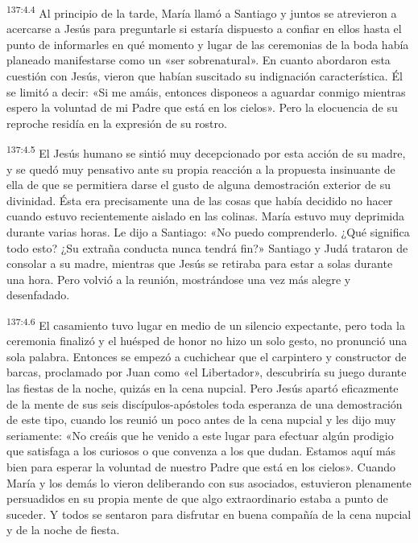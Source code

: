 \par 
\textsuperscript{137:4.4} Al principio de la tarde, María llamó a Santiago y juntos se atrevieron a acercarse a Jesús para preguntarle si estaría dispuesto a confiar en ellos hasta el punto de informarles en qué momento y lugar de las ceremonias de la boda había planeado manifestarse como un «ser sobrenatural». En cuanto abordaron esta cuestión con Jesús, vieron que habían suscitado su indignación característica. Él se limitó a decir: «Si me amáis, entonces disponeos a aguardar conmigo mientras espero la voluntad de mi Padre que está en los cielos». Pero la elocuencia de su reproche residía en la expresión de su rostro.

\par 
\textsuperscript{137:4.5} El Jesús humano se sintió muy decepcionado por esta acción de su madre, y se quedó muy pensativo ante su propia reacción a la propuesta insinuante de ella de que se permitiera darse el gusto de alguna demostración exterior de su divinidad. Ésta era precisamente una de las cosas que había decidido no hacer cuando estuvo recientemente aislado en las colinas. María estuvo muy deprimida durante varias horas. Le dijo a Santiago: «No puedo comprenderlo. ¿Qué significa todo esto? ¿Su extraña conducta nunca tendrá fin?» Santiago y Judá trataron de consolar a su madre, mientras que Jesús se retiraba para estar a solas durante una hora. Pero volvió a la reunión, mostrándose una vez más alegre y desenfadado.

\par 
\textsuperscript{137:4.6} El casamiento tuvo lugar en medio de un silencio expectante, pero toda la ceremonia finalizó y el huésped de honor no hizo un solo gesto, no pronunció una sola palabra. Entonces se empezó a cuchichear que el carpintero y constructor de barcas, proclamado por Juan como «el Libertador», descubriría su juego durante las fiestas de la noche, quizás en la cena nupcial. Pero Jesús apartó eficazmente de la mente de sus seis discípulos-apóstoles toda esperanza de una demostración de este tipo, cuando los reunió un poco antes de la cena nupcial y les dijo muy seriamente: «No creáis que he venido a este lugar para efectuar algún prodigio que satisfaga a los curiosos o que convenza a los que dudan. Estamos aquí más bien para esperar la voluntad de nuestro Padre que está en los cielos». Cuando María y los demás lo vieron deliberando con sus asociados, estuvieron plenamente persuadidos en su propia mente de que algo extraordinario estaba a punto de suceder. Y todos se sentaron para disfrutar en buena compañía de la cena nupcial y de la noche de fiesta.

